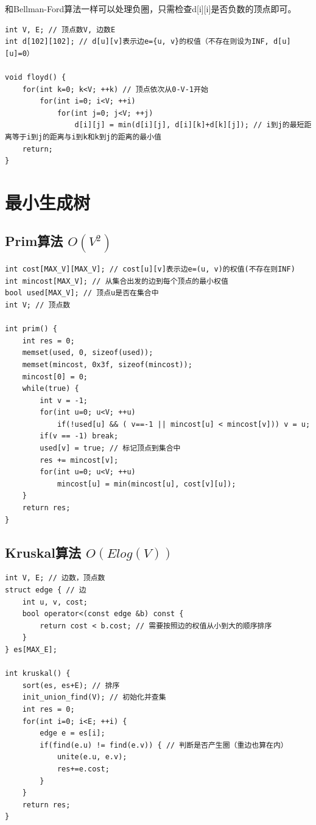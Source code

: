 \documentclass[a4paper]{ctexrep}
\begin{document}
和Bellman-Ford算法一样可以处理负圈，只需检查d[i][i]是否负数的顶点即可。

\begin{lstlisting}
int V, E; // 顶点数V, 边数E
int d[102][102]; // d[u][v]表示边e={u, v}的权值（不存在则设为INF, d[u][u]=0）

void floyd() {
	for(int k=0; k<V; ++k) // 顶点依次从0-V-1开始
		for(int i=0; i<V; ++i)
			for(int j=0; j<V; ++j)
				d[i][j] = min(d[i][j], d[i][k]+d[k][j]); // i到j的最短距离等于i到j的距离与i到k和k到j的距离的最小值
	return;
}
\end{lstlisting}
\section{最小生成树}
\subsection{Prim算法 $O(V^2)$}
\begin{lstlisting}
int cost[MAX_V][MAX_V]; // cost[u][v]表示边e=(u, v)的权值(不存在则INF)
int mincost[MAX_V]; // 从集合出发的边到每个顶点的最小权值
bool used[MAX_V]; // 顶点u是否在集合中
int V; // 顶点数

int prim() {
	int res = 0;
	memset(used, 0, sizeof(used));
	memset(mincost, 0x3f, sizeof(mincost));
	mincost[0] = 0;
	while(true) {
		int v = -1;
		for(int u=0; u<V; ++u)
			if(!used[u] && ( v==-1 || mincost[u] < mincost[v])) v = u;
		if(v == -1) break;
		used[v] = true; // 标记顶点到集合中
		res += mincost[v];
		for(int u=0; u<V; ++u)
			mincost[u] = min(mincost[u], cost[v][u]);
	}
	return res;
}
\end{lstlisting}

\subsection{Kruskal算法 $O(E log(V))$}
\begin{lstlisting}
int V, E; // 边数，顶点数
struct edge { // 边
	int u, v, cost;
	bool operator<(const edge &b) const {
		return cost < b.cost; // 需要按照边的权值从小到大的顺序排序
	}
} es[MAX_E];

int kruskal() {
	sort(es, es+E); // 排序
	init_union_find(V); // 初始化并查集
	int res = 0;
	for(int i=0; i<E; ++i) {
		edge e = es[i];
		if(find(e.u) != find(e.v)) { // 判断是否产生圈（重边也算在内）
			unite(e.u, e.v);
			res+=e.cost;
		}
	}
	return res;
}
\end{lstlisting}
\end{document}
